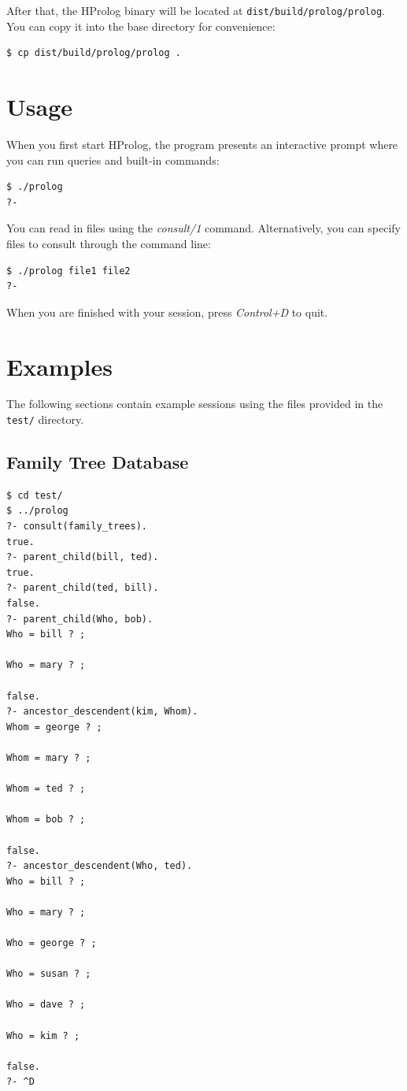 \documentclass[11pt]{report}
\begin{document}
After that, the HProlog binary will be located at \texttt{dist/build/prolog/prolog}. You can copy it into the base directory for convenience:

\begin{verbatim}
$ cp dist/build/prolog/prolog .
\end{verbatim}


\section{Usage}

When you first start HProlog, the program presents an interactive prompt where you can run queries and built-in commands:

\begin{verbatim}
$ ./prolog
?-
\end{verbatim}

You can read in files using the \emph{consult/1} command. Alternatively, you can specify files to consult through the command line:

\begin{verbatim}
$ ./prolog file1 file2
?-
\end{verbatim}

When you are finished with your session, press \emph{Control+D} to quit.


\section{Examples}

The following sections contain example sessions using the files provided in the \texttt{test/} directory.

\subsection{Family Tree Database}

\begin{verbatim}
$ cd test/
$ ../prolog
?- consult(family_trees).
true.
?- parent_child(bill, ted).
true.
?- parent_child(ted, bill).
false.
?- parent_child(Who, bob).
Who = bill ? ;

Who = mary ? ;

false.
?- ancestor_descendent(kim, Whom).
Whom = george ? ;

Whom = mary ? ;

Whom = ted ? ;

Whom = bob ? ;

false.
?- ancestor_descendent(Who, ted).
Who = bill ? ;

Who = mary ? ;

Who = george ? ;

Who = susan ? ;

Who = dave ? ;

Who = kim ? ;

false.
?- ^D
\end{verbatim}
\end{document}
